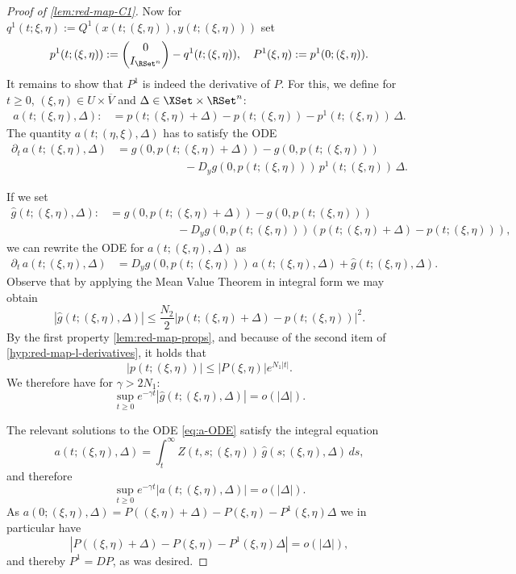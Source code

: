 \documentclass[a4paper]{siamart190516}
\begin{document}
\begin{proof}[Proof of \cref{lem:red-map-C1}]
Now for $q^1(t;\xi,\eta) := Q^1(x(t;(\xi,\eta)),y(t;(\xi,\eta)))$ set
\[
p^1(t;(\xi,\eta)) := \begin{pmatrix} 0 \\ I_{\RSet^n} \end{pmatrix} - q^1(t;(\xi,\eta)), \quad P^1(\xi,\eta) := p^1(0;(\xi,\eta)).
\]
It remains to show that $P^1$ is indeed the derivative of $P$. For this, we define for $t \geq 0$, $(\xi,\eta) \in U \times \overline{V}$ and $\Delta \in \XSet \times \RSet^n$:
\begin{align*}
a(t; (\xi,\eta), \Delta) :&= p(t; (\xi,\eta) + \Delta) - p(t; (\xi,\eta)) - p^1(t; (\xi,\eta)) \, \Delta.
\end{align*}
The quantity $a(t; (\eta,\xi), \Delta)$ has to satisfy the ODE
\begin{equation*}
\begin{aligned}
\partial_t \, a(t; (\xi,\eta), \Delta) &= g(0,p(t;(\xi,\eta)+\Delta)) - g(0,p(t;(\xi,\eta))) \\
&\qquad \qquad \qquad - D_y g(0,p(t;(\xi,\eta))) \, p^1(t;(\xi,\eta)) \, \Delta.
\end{aligned}
\end{equation*}

If we set
\begin{align*}
\hat{g}(t; (\xi,\eta), \Delta) :&= g(0,p(t;(\xi,\eta)+\Delta)) - g(0,p(t;(\xi,\eta))) \\
&\qquad \qquad \qquad - D_y g(0,p(t;(\xi,\eta))) \left( p(t;(\xi,\eta)+\Delta) - p(t;(\xi,\eta))  \right),
\end{align*}
we can rewrite the ODE for $a(t; (\xi,\eta), \Delta)$ as
\begin{equation}\label{eq:a-ODE}
\begin{aligned}
\partial_t \, a(t; (\xi,\eta), \Delta) &= D_y g(0,p(t;(\xi,\eta))) \, a(t; (\xi,\eta), \Delta) + \hat{g}(t; (\xi,\eta), \Delta) .
\end{aligned}
\end{equation}
Observe that by applying the Mean Value Theorem in integral form we may obtain
\[
| \hat{g}(t; (\xi,\eta), \Delta) | \leq \frac{N_2}{2} \left| p(t;(\xi,\eta)+\Delta) - p(t;(\xi,\eta))  \right|^2.
\]
By the first property \cref{lem:red-map-props}, and because of the second item of \cref{hyp:red-map-l-derivatives}, it holds that
\[
| p(t;(\xi,\eta)) | \leq | P(\xi,\eta) | e^{N_1|t|}.
\]
We therefore have for $\gamma > 2N_1$:
\[
\sup_{t \geq 0} e^{-\gamma t} | \hat{g}(t; (\xi,\eta), \Delta) | = o(|\Delta|).
\]

The relevant solutions to the ODE \cref{eq:a-ODE} satisfy the integral equation
\[
 a(t; (\xi,\eta), \Delta) =   \int_t^{\infty} Z(t,s; (\xi,\eta)) \, \hat{g}(s; (\xi,\eta), \Delta) \, ds,
\]
and therefore
\[
\sup_{t \geq 0} e^{-\gamma t} |  a(t; (\xi,\eta), \Delta)  | = o(|\Delta|).
\]
As $a(0; (\xi,\eta), \Delta) = P((\xi,\eta)+\Delta) - P(\xi,\eta) - P^1(\xi,\eta) \Delta$ we in particular have
\[
\left| P((\xi,\eta)+\Delta) - P(\xi,\eta) - P^1(\xi,\eta) \Delta \right| =   o(|\Delta|),
\]
and thereby $P^1 = DP$, as was desired. 
\end{proof}
\end{document}

